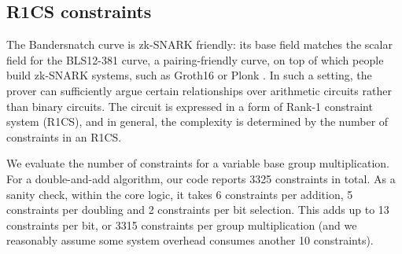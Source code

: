 \documentclass{article}
\theoremstyle{definition}
\begin{document}
\subsection{R1CS constraints}
The Bandersnatch curve is zk-SNARK friendly: its 
base field matches the scalar field for the BLS12-381 curve, a 
pairing-friendly curve, on top of which people build zk-SNARK
systems, such as Groth16 \cite{EC:Groth16} or Plonk \cite{EPRINT:GabWilCio19}.
In such a setting, the prover can sufficiently argue certain 
relationships over arithmetic circuits rather than binary
circuits.
The circuit is expressed in a form of Rank-1 constraint system
(R1CS), and in general, the complexity is determined by the 
number of constraints in an R1CS. 

We evaluate the number of constraints for a 
variable base group multiplication. For a double-and-add
algorithm, 
our code reports 3325 constraints in 
total.
As a sanity check, within the core logic,
it takes 6 constraints per addition, 5 constraints
per doubling and 2 constraints per bit selection. This adds
up to 13 constraints per bit, or 3315 constraints per
group multiplication (and we reasonably assume some system overhead
consumes another 10 constraints). 



  
\end{document}
